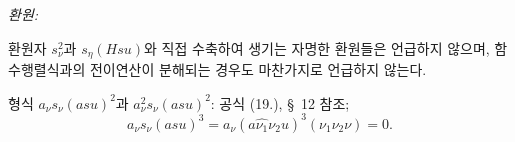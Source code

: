 
\noindent\emph{환원:}

환원자 $s_\nu^2$과 $s_\eta(Hsu)$와 직접 수축하여 생기는 자명한 환원들은 언급하지 않으며, 함수행렬식과의 전이연산이 분해되는 경우도 마찬가지로 언급하지 않는다.

형식 $a_\nu s_\nu(asu)^2$과 $a_\nu^2s_\nu(asu)^2$: 공식 (19.), \S\ 12 참조;
\[
a_\nu s_\nu(asu)^3=a_\nu(a\widehat{\nu_1}\nu_2u)^3(\nu_1\nu_2\nu)=0.
\]
